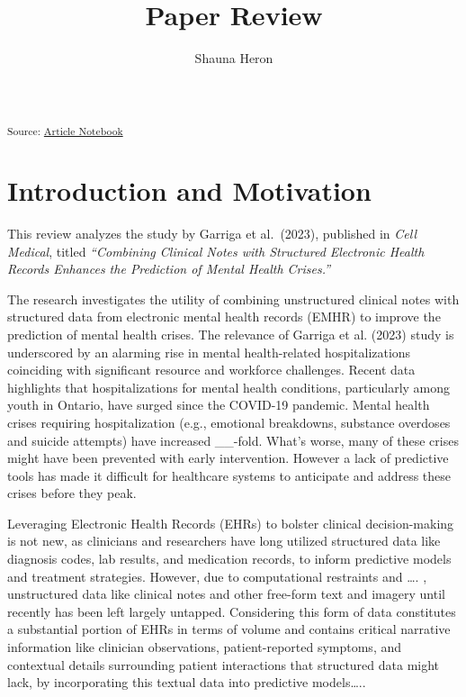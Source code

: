 \documentclass[
  letterpaper,
  DIV=11,
  numbers=noendperiod]{scrartcl}
\title{Paper Review}
\author{Shauna Heron}
\date{}
\renewcommand*\contentsname{Table of contents}
\newcommand\contentsname{Table of contents}
\begin{document}
\maketitle

\renewcommand*\contentsname{Table of contents}
{
\hypersetup{linkcolor=}
\setcounter{tocdepth}{3}
\tableofcontents
}

\textsubscript{Source:
\href{https://shaunaheron2.github.io/ML_Assignment2/index.qmd.html}{Article
Notebook}}

\section{\texorpdfstring{\textbf{Introduction and
Motivation}}{Introduction and Motivation}}\label{introduction-and-motivation}

This review analyzes the study by Garriga et al.~(2023), published in
\emph{Cell Medical}, titled \emph{``Combining Clinical Notes with
Structured Electronic Health Records Enhances the Prediction of Mental
Health Crises.''}

The research investigates the utility of combining unstructured clinical
notes with structured data from electronic mental health records (EMHR)
to improve the prediction of mental health crises. The relevance of
Garriga et al. (2023) study is underscored by an alarming rise in mental
health-related hospitalizations coinciding with significant resource and
workforce challenges. Recent data highlights that hospitalizations for
mental health conditions, particularly among youth in Ontario, have
surged since the COVID-19 pandemic. Mental health crises requiring
hospitalization (e.g., emotional breakdowns, substance overdoses and
suicide attempts) have increased \_\_-fold. What's worse, many of these
crises might have been prevented with early intervention. However a lack
of predictive tools has made it difficult for healthcare systems to
anticipate and address these crises before they peak.

Leveraging Electronic Health Records (EHRs) to bolster clinical
decision-making is not new, as clinicians and researchers have long
utilized structured data like diagnosis codes, lab results, and
medication records, to inform predictive models and treatment
strategies. However, due to computational restraints and \ldots. ,
unstructured data like clinical notes and other free-form text and
imagery until recently has been left largely untapped. Considering this
form of data constitutes a substantial portion of EHRs in terms of
volume and contains critical narrative information like clinician
observations, patient-reported symptoms, and contextual details
surrounding patient interactions that structured data might lack, by
incorporating this textual data into predictive models\ldots..
\end{document}

